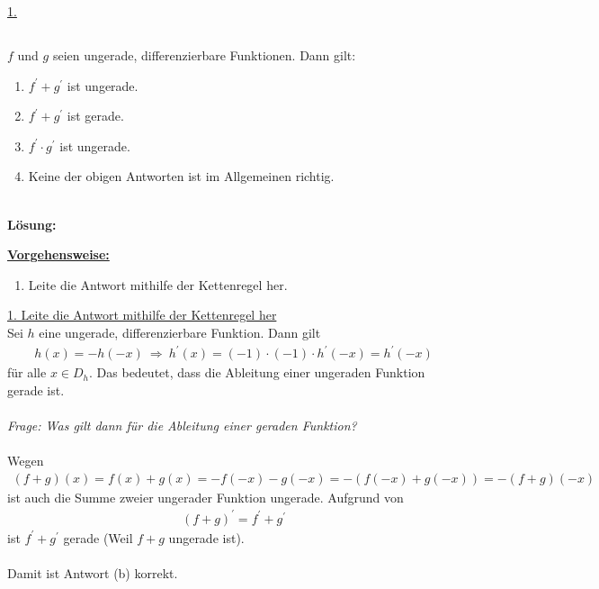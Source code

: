 \underline{1. }\\

\newpage

\subsection*{}
$ f $ und $ g $ seien ungerade, differenzierbare Funktionen. Dann gilt:
\renewcommand{\labelenumi}{(\alph{enumi})}
\begin{enumerate}
	\item 
	$ f^\prime + g^\prime $ ist ungerade.
	\item
	$ f^\prime + g^\prime $ ist gerade.
	\item
	$ f^\prime \cdot g^\prime $ ist ungerade.
	\item
	Keine der obigen Antworten ist im Allgemeinen richtig.
\end{enumerate}
\ \\
\textbf{Lösung:}
\begin{mdframed}
\underline{\textbf{Vorgehensweise:}}
\renewcommand{\labelenumi}{\theenumi.}
\begin{enumerate}
\item Leite die Antwort mithilfe der Kettenregel her.
\end{enumerate}
\end{mdframed}

\underline{1. Leite die Antwort mithilfe der Kettenregel her}\\
Sei $ h  $ eine ungerade, differenzierbare Funktion.
Dann gilt
\begin{align*}
	h(x) = -h(-x)
	\ \Rightarrow \
	h^\prime (x) = (-1) \cdot (-1) \cdot h^\prime(-x) = h^\prime(-x)
\end{align*}
für alle $ x \in D_h $. Das bedeutet, dass die Ableitung einer ungeraden Funktion gerade ist.\\
\\
\textit{Frage: Was gilt dann für die Ableitung einer geraden Funktion?}\\
\\
Wegen 
\begin{align*}
	(f+g)(x) = f(x) +g(x) =-f(-x) - g(-x)
	=-(f(-x) + g(-x))= -(f+g)(-x)
\end{align*}
ist auch die Summe zweier ungerader Funktion ungerade. Aufgrund von 
\begin{align*}
	(f+g)^\prime = f^\prime + g^\prime
\end{align*}
ist $ f^\prime + g^\prime $ gerade (Weil $ f+g $ ungerade ist).\\
\\
Damit ist Antwort (b) korrekt.


